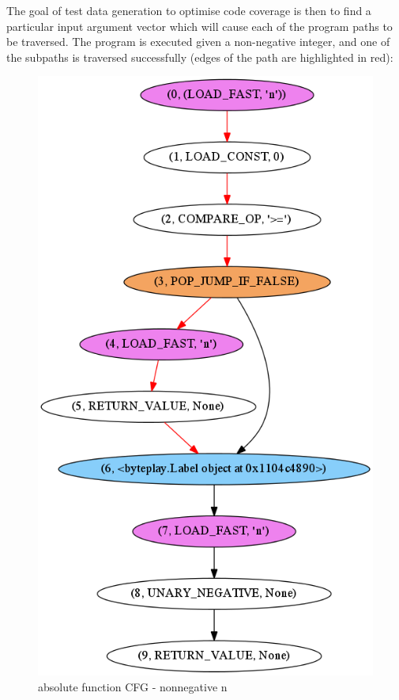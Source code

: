 \documentclass{icldt}
\numberwithin{equation}{section}       %
\begin{document}
{{The goal of test data generation to optimise code coverage is then to find a particular input argument vector which will cause each of the program paths to be traversed.
\clearpage
The program is executed given a non-negative integer, and one of the subpaths is traversed successfully (edges of the path are highlighted in red):
\begin{figure}[H]
	\centering
	\includegraphics[scale=.39]{img/abs-trace.png}
	\caption{absolute function CFG - nonnegative n}
	\label{fig:abs-fn-cfg-nonneg}
\end{figure}

}}
\end{document}
